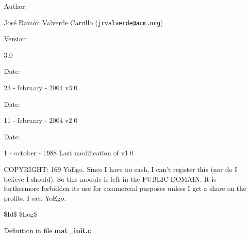 \begin{Desc}
\item[Author: ]\par
Jos\'{e} Ram\'{o}n Valverde Carrillo ({\tt jrvalverde@acm.org})\end{Desc}
\begin{Desc}
\item[Version: ]\par
3.0\end{Desc}
\begin{Desc}
\item[Date: ]\par
23 - february - 2004 v3.0\end{Desc}
\begin{Desc}
\item[Date: ]\par
11 - february - 2004 v2.0\end{Desc}
\begin{Desc}
\item[Date: ]\par
1 - october - 1988 Last modification of v1.0\end{Desc}
COPYRIGHT: 169 Yo\-Ego. Since I have no cash, I can't register this (nor do I believe I should). So this module is left in the PUBLIC DOMAIN. It is furthermore forbidden its use for commercial purposes unless I get a share on the profits. I say. Yo\-Ego.

\$Id\$ \$Log\$



Definition in file {\bf mat\_\-init.c}.